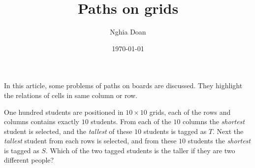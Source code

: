 \documentclass{article}
\title{Paths on grids}
\author{Nghia Doan}
\date{\today}
\begin{document}
\maketitle

In this article, some problems of paths on boards are discussed.
They highlight the relations of cells in same column or row.

\begin{example*}

    One hundred students are positioned in $10 \times 10$ grids,
    each of the rows and columns contains exactly $10$ students.
    From each of the $10$ columns the \textit{shortest} student is selected,
    and the \textit{tallest} of these $10$ students is tagged as $T$.
    Next the \textit{tallest} student from each rows is selected,
    and from these $10$ students the \textit{shortest} is tagged as $S$.
    Which of the two tagged students is the taller if they are two different people?
\end{example*}
\end{document}
